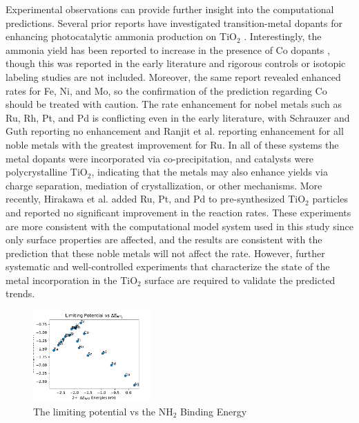 Experimental observations can provide further insight into the computational predictions. Several prior reports have investigated transition-metal dopants for enhancing photocatalytic ammonia production on TiO$_2$ \cite{Schrauzer_1977, Ranjit_1996, Hirakawa_2017}. Interestingly, the ammonia yield has been reported to increase in the presence of Co dopants \cite{Schrauzer_1977}, though this was reported in the early literature and rigorous controls \cite{Greenlee_2018} or isotopic labeling studies \cite{Andersen_2019} are not included. Moreover, the same report revealed enhanced rates for Fe, Ni, and Mo, so the confirmation of the prediction regarding Co should be treated with caution. The rate enhancement for nobel metals such as Ru, Rh, Pt, and Pd is conflicting even in the early literature, with Schrauzer and Guth reporting no enhancement \cite{Schrauzer_1977} and Ranjit et al. reporting enhancement for all noble metals with the greatest improvement for Ru\cite{Ranjit_1996}. In all of these systems the metal dopants were incorporated via co-precipitation, and catalysts were polycrystalline TiO$_2$, indicating that the metals may also enhance yields via charge separation, mediation of crystallization, or other mechanisms\cite{Medford_2017}. More recently, Hirakawa et al. added Ru, Pt, and Pd to pre-synthesized TiO$_2$ particles and reported no significant improvement in the reaction rates\cite{Hirakawa_2017}. These experiments are more consistent with the computational model system used in this study since only surface properties are affected, and the results are consistent with the prediction that these noble metals will not affect the rate. However, further systematic and well-controlled experiments that characterize the state of the metal incorporation in the TiO$_2$ surface are required to validate the predicted trends.




\begin{figure}
    \centering
    \includegraphics[width=0.4\textwidth]{Images/NH2_v_limiting_pot.pdf}
    
    \caption{The limiting potential vs the NH$_2$ Binding Energy}
    \label{fig:NH2_limiting_pot}
\end{figure}

